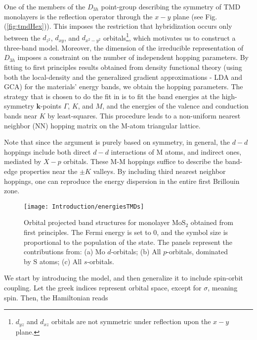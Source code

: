 One of the members of the $D_{3h}$ point-group describing the symmetry of \ac{TMD} monolayers is the reflection operator through the $x-y$ plane (see Fig.(\ref{fig:tmdHex})).
This imposes the restriction that hybridization occurs only between the $d_{z^2}$, $d_{xy}$, and $d_{x^2 - y^2}$ orbitals\footnote{$d_{yz}$ and $d_{xz}$ orbitals are not symmetric under reflection upon the $x-y$ plane.}, which motivates us to construct a three-band model.
Moreover, the dimension of the irreducible representation of $D_{3h}$ imposes a constraint on the number of independent hopping parameters.
By fitting to first principles results obtained from density functional theory (using both the local-density and the generalized gradient approximations - LDA and GCA) for the materials' energy bands, we obtain the hopping parameters.
The strategy that is chosen to do the fit in \cite{liu_three-band_2013} is to fit the band energies at the high-symmetry $\bm k$-points $\Gamma$, $K$, and $M$, and the energies of the valence and conduction bands near $K$ by least-squares.
This procedure leads to a non-uniform nearest neighbor (NN) hopping matrix on the M-atom triangular lattice.

Note that since the argument is purely based on symmetry, in general, the $d-d$ hoppings include both direct $d-d$ interactions of M atoms, and indirect ones, mediated by $X-p$ orbitals.
These M-M hoppings suffice to describe the band-edge properties near the $\pm K$ valleys.
By including third nearest neighbor hoppings, one can reproduce the energy dispersion in  the entire first Brillouin zone.

\begin{figure}[H]
\centering
\texttt{[image: Introduction/energiesTMDs]}
\caption[Orbital projected band structures for monolayer $\text{Mo}\text{S}_2$ obtained from first principles.]{Orbital projected band structures for monolayer $\text{Mo}\text{S}_2$ obtained from first principles.
The Fermi energy is set to 0, and the symbol size is proportional to the population of the state.
The panels represent the contributions from: (a) $\text{Mo}$ $d$-orbitals; (b) All $p$-orbitals, dominated by $\text{S}$ atoms; (c) All $s$-orbitals. }
\label{fig:energiesTMDs}
\end{figure}	

We start by introducing the  model, and then generalize it to include spin-orbit coupling.
Let the greek indices represent orbital space, except for $\sigma$, meaning spin.
Then, the Hamiltonian reads

